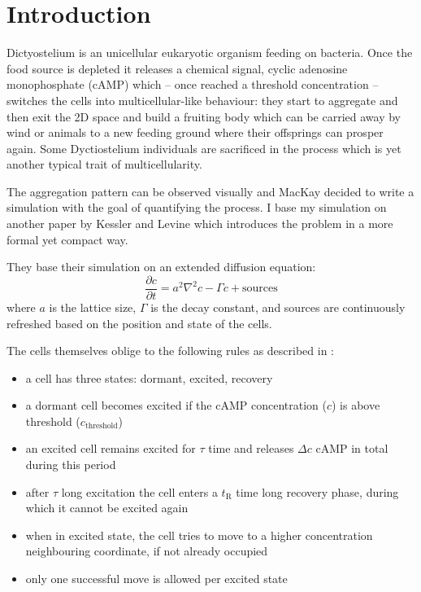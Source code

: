 \documentclass[a4paper,12pt]{article}
\begin{document}
\section{Introduction}

Dictyostelium is an unicellular eukaryotic organism feeding on bacteria. Once the food source is depleted it releases a chemical signal, cyclic adenosine monophosphate (cAMP) which -- once reached a threshold concentration -- switches the cells into multicellular-like behaviour: they start to aggregate and then exit the 2D space and build a fruiting body which can be carried away by wind or animals to a new feeding ground where their offsprings can prosper again. Some Dyctiostelium individuals are sacrificed in the process which is yet another typical trait of multicellularity.

The aggregation pattern can be observed visually and MacKay \cite{mackay1978} decided to write a simulation with the goal of quantifying the process. I base my simulation on another paper by Kessler and Levine \cite{kessler1993} which introduces the problem in a more formal yet compact way.

They base their simulation on an extended diffusion equation:
\begin{equation}
\label{eq:egy}
 \frac{\partial c}{\partial t} = a^2 \nabla^2 c - \Gamma c + \textrm{sources}
\end{equation}
where $a$ is the lattice size, $\Gamma$ is the decay constant, and sources are continuously refreshed based on the position and state of the cells.

The cells themselves oblige to the following rules as described in \cite{kessler1993}:
\begin{itemize}
 \item a cell has three states: dormant, excited, recovery
 \item a dormant cell becomes excited if the cAMP concentration ($c$) is above threshold ($c_\text{threshold}$)
 \item an excited cell remains excited for $\tau$ time and releases $\Delta c$ cAMP in total during this period
 \item after $\tau$ long excitation the cell enters a $t_\text{R}$ time long recovery phase, during which it cannot be excited again
 \item when in excited state, the cell tries to move to a higher concentration neighbouring coordinate, if not already occupied
 \item only one successful move is allowed per excited state
\end{itemize}
\end{document}
